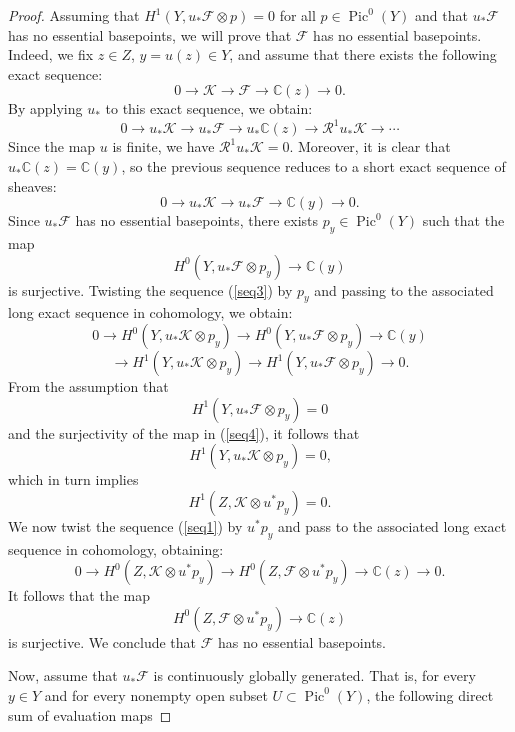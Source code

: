 \documentclass[sn-mathphys-num]{sn-jnl}%
\newcommand{\C}{\mathbb{C}}
\theoremstyle{definition}
\numberwithin{equation}{section}
\begin{document}
\begin{proof}
Assuming that  $H^{1}(Y, u_{*}\mathcal{F} \otimes p) =0$ for all $p \in \operatorname{Pic}^{0}(Y)$ and that $u_{*}\mathcal{F}$ has no essential basepoints, we will prove that $\mathcal{F}$ has no essential basepoints. Indeed,
we fix $z \in Z$, $y = u(z) \in Y$, and  assume that there exists the following exact sequence:
\begin{equation}\label{seq1}
0 \to \mathcal{K} \to \mathcal{F} \to \C(z) \to 0 \text{.}
\end{equation}
By applying $u_{*}$ to this exact sequence, we obtain: 
\begin{equation}\label{seq2}
0 \to u_{*}\mathcal{K} \to u_{*}\mathcal{F} \to u_{*}\C(z) \to \mathcal{R}^{1}u_{*}\mathcal{K} \to \cdots
\end{equation}
Since the map $u$ is finite, we have $\mathcal{R}^{1}u_{*}\mathcal{K} = 0$. Moreover, it is clear that $u_{*}\C(z) = \C(y)$, so the previous sequence reduces to a short exact sequence of sheaves:
\begin{equation}\label{seq3}
0 \to u_{*}\mathcal{K} \to u_{*}\mathcal{F} \to \C(y) \to 0 \text{.}
\end{equation}
Since  $u_{*}\mathcal{F}$ has no essential basepoints, there exists $p_{y} \in \operatorname{Pic}^{0}(Y)$ such that the map 
\begin{equation}\label{seq4}
H^{0}(Y, u_{*}\mathcal{F} \otimes p_{y}) \to \C(y)  
\end{equation}
is surjective. Twisting the sequence (\ref{seq3}) by $p_{y}$ and  passing to the associated long exact sequence in cohomology, we obtain:
\[
    0 \to H^{0}(Y, u_{*}\mathcal{K} \otimes p_{y}) \to H^{0}(Y, u_{*}\mathcal{F} \otimes p_{y}) \to \C(y)\]
    \[\to H^{1}(Y, u_{*}\mathcal{K} \otimes p_{y}) \to H^{1}(Y, u_{*}\mathcal{F} \otimes p_{y})
\to 0 \text{.} \]
From the assumption that $$H^{1}(Y, u_{*}\mathcal{F} \otimes p_{y}) =0$$ and the surjectivity of the map in (\ref{seq4}), it follows that $$H^{1}(Y, u_{*}\mathcal{K} \otimes p_{y}) = 0 \text{,}$$ which in turn implies $$H^{1}(Z, \mathcal{K} \otimes u^{*}p_{y}) = 0 \text{.}$$ 
We now twist the sequence (\ref{seq1}) by $u^{*}p_{y}$ and pass to the associated long exact sequence in cohomology, obtaining:
\[
0 \to H^{0}(Z, \mathcal{K} \otimes u^{*}p_{y}) \to H^{0}(Z, \mathcal{F} \otimes u^{*}p_{y}) \to \C(z) \to 0 \text{.}
\]
It follows that the map $$H^{0}(Z, \mathcal{F} \otimes u^{*}p_{y}) \to \C(z)$$
is surjective. We conclude that $\mathcal{F}$ has no essential basepoints.    
\par Now, assume that  $u_{*}\mathcal{F}$ is continuously globally generated. That is, for every $y \in Y$ and for every nonempty open subset $U \subset \operatorname{Pic}^{0}(Y)$, the following direct sum of evaluation maps 

\end{proof}
\end{document}
